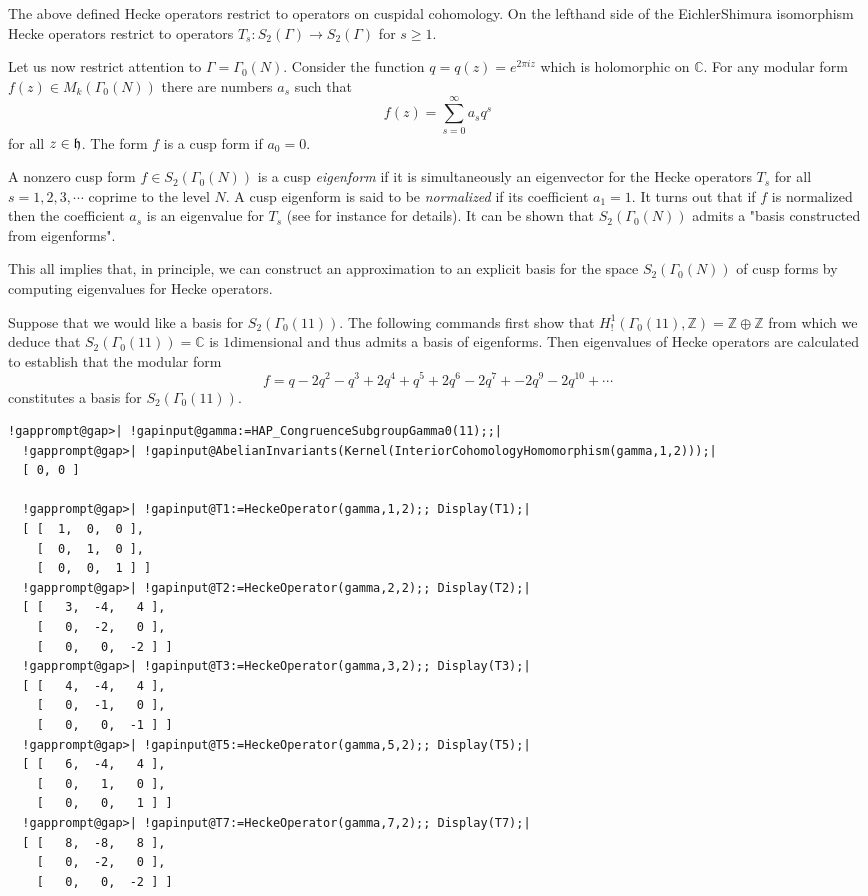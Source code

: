 \documentclass[a4paper,11pt]{report}
\begin{document}
{{ The above defined Hecke operators restrict to operators on cuspidal
cohomology. On the left\texttt{}hand side of the
Eichler\texttt{}Shimura isomorphism Hecke operators restrict to
operators $T_s\colon S_2(\Gamma) \rightarrow S_2(\Gamma)$ for $s\ge 1$. 

Let us now restrict attention to $\Gamma=\Gamma_0(N)$. Consider the function $q=q(z)=e^{2\pi i z}$ which is holomorphic on $\mathbb C$. For any modular form $f(z) \in M_k(\Gamma_0(N))$ there are numbers $a_s$ such that 
\[f(z) = \sum_{s=0}^\infty a_sq^s \]
 for all $z\in {\frak h}$. The form $f$ is a cusp form if $a_0=0$. 

 A non\texttt{}zero cusp form $f\in S_2(\Gamma_0(N))$ is a cusp \emph{eigenform} if it is simultaneously an eigenvector for the Hecke operators $T_s$ for all $s =1,2,3,\cdots$ coprime to the level $N$. A cusp eigenform is said to be \emph{normalized} if its coefficient $a_1=1$. It turns out that if $f$ is normalized then the coefficient $a_s$ is an eigenvalue for $T_s$ (see for instance \cite{stein} for details). It can be shown \cite{atkinlehner} that $S_2(\Gamma_0(N))$ admits a "basis constructed from eigenforms". 

 This all implies that, in principle, we can construct an approximation to an
explicit basis for the space $S_2(\Gamma_0(N))$ of cusp forms by computing eigenvalues for Hecke operators. 

 Suppose that we would like a basis for $S_2(\Gamma_0(11))$. The following commands first show that $H^1_{!}(\Gamma_0(11),\mathbb Z)=\mathbb Z\oplus \mathbb Z$ from which we deduce that $S_2(\Gamma_0(11)) =\mathbb C$ is $1$\texttt{}dimensional and thus admits a basis of eigenforms. Then
eigenvalues of Hecke operators are calculated to establish that the modular
form 
\[f = q -2q^2 -q^3 +2q^4 +q^5 +2q^6 -2q^7 + -2q^9 -2q^{10} + \cdots \]
 constitutes a basis for $S_2(\Gamma_0(11))$. 
\begin{Verbatim}[commandchars=!@|,fontsize=\small,frame=single,label=Example]
  !gapprompt@gap>| !gapinput@gamma:=HAP_CongruenceSubgroupGamma0(11);;|
  !gapprompt@gap>| !gapinput@AbelianInvariants(Kernel(InteriorCohomologyHomomorphism(gamma,1,2)));|
  [ 0, 0 ]
  
  !gapprompt@gap>| !gapinput@T1:=HeckeOperator(gamma,1,2);; Display(T1);|
  [ [  1,  0,  0 ],
    [  0,  1,  0 ],
    [  0,  0,  1 ] ]
  !gapprompt@gap>| !gapinput@T2:=HeckeOperator(gamma,2,2);; Display(T2);|
  [ [   3,  -4,   4 ],
    [   0,  -2,   0 ],
    [   0,   0,  -2 ] ]
  !gapprompt@gap>| !gapinput@T3:=HeckeOperator(gamma,3,2);; Display(T3);|
  [ [   4,  -4,   4 ],
    [   0,  -1,   0 ],
    [   0,   0,  -1 ] ]
  !gapprompt@gap>| !gapinput@T5:=HeckeOperator(gamma,5,2);; Display(T5);|
  [ [   6,  -4,   4 ],
    [   0,   1,   0 ],
    [   0,   0,   1 ] ]
  !gapprompt@gap>| !gapinput@T7:=HeckeOperator(gamma,7,2);; Display(T7);|
  [ [   8,  -8,   8 ],
    [   0,  -2,   0 ],
    [   0,   0,  -2 ] ]
  

\end{Verbatim}}}
\end{document}
